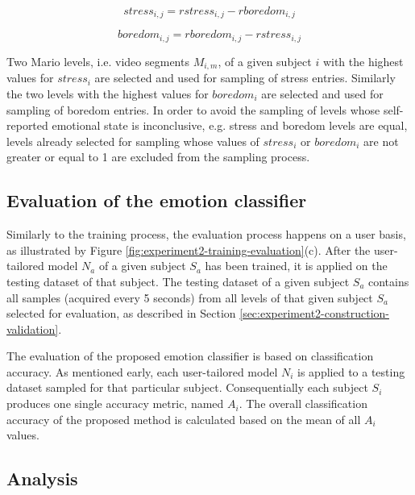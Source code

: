 \begin{equation}
  stress_{i,j} = rstress_{i,j} - rboredom_{i,j}
  \label{eq:stress-score}
\end{equation}

\begin{equation}
  boredom_{i,j} = rboredom_{i,j} - rstress_{i,j}
  \label{eq:boredom-score}
\end{equation}

Two Mario levels, i.e. video segments $M_{i,m}$, of a given subject $i$ with the highest values for $stress_i$ are selected and used for sampling of stress entries. Similarly the two levels with the highest values for $boredom_i$ are selected and used for sampling of boredom entries. In order to avoid the sampling of levels whose self-reported emotional state is inconclusive, e.g. stress and boredom levels are equal, levels already selected for sampling whose values of $stress_i$ or $boredom_i$ are not greater or equal to 1 are excluded from the sampling process.

\subsection{Evaluation of the emotion classifier}

Similarly to the training process, the evaluation process happens on a user basis, as illustrated by Figure \ref{fig:experiment2-training-evaluation}(c). After the user-tailored model $N_a$ of a given subject $S_a$ has been trained, it is applied on the testing dataset of that subject. The testing dataset of a given subject $S_a$ contains all samples (acquired every 5 seconds) from all levels of that given subject $S_a$ selected for evaluation, as described in Section \ref{sec:experiment2-construction-validation}.

The evaluation of the proposed emotion classifier is based on classification accuracy. As mentioned early, each user-tailored model $N_i$ is applied to a testing dataset sampled for that particular subject. Consequentially each subject $S_i$ produces one single accuracy metric, named $A_i$. The overall classification accuracy of the proposed method is calculated based on the mean of all $A_i$ values.

\subsection{Analysis}

